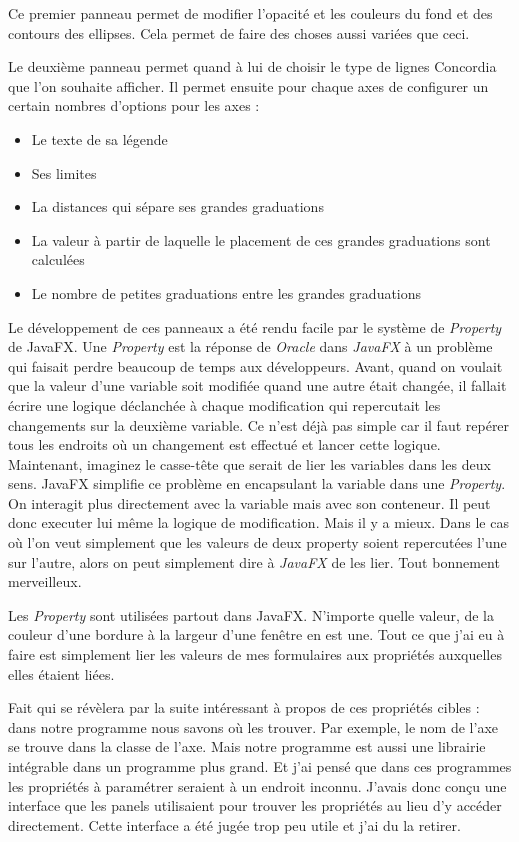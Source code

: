Ce premier panneau permet de modifier l'opacité et les couleurs du fond et des contours des ellipses. Cela permet de faire des choses aussi variées que ceci.


Le deuxième panneau permet quand à lui de choisir le type de lignes Concordia que l'on souhaite afficher. Il permet ensuite pour chaque axes de configurer un certain nombres d'options pour les axes : 
\begin{itemize}
\item Le texte de sa légende
\item Ses limites
\item La distances qui sépare ses grandes graduations
\item La valeur à partir de laquelle le placement de ces grandes graduations sont calculées
\item Le nombre de petites graduations entre les grandes graduations
\end{itemize}

Le développement de ces panneaux a été rendu facile par le système de \textit{Property} de JavaFX. Une \textit{Property} est la réponse de \textit{Oracle} dans \textit{JavaFX} à un problème qui faisait perdre beaucoup de temps aux développeurs. Avant, quand on voulait que la valeur d'une variable soit modifiée quand une autre était changée, il fallait écrire une logique déclanchée à chaque modification qui repercutait les changements sur la deuxième variable. Ce n'est déjà pas simple car il faut repérer tous les endroits où un changement est effectué et lancer cette logique. Maintenant, imaginez le casse-tête que serait de lier les variables dans les deux sens. JavaFX simplifie ce problème en encapsulant la variable dans une \textit{Property}. On interagit plus directement avec la variable mais avec son conteneur. Il peut donc executer lui même la logique de modification. Mais il y a mieux. Dans le cas où l'on veut simplement que les valeurs de deux property soient repercutées l'une sur l'autre, alors on peut simplement dire à \textit{JavaFX} de les lier. Tout bonnement merveilleux.

Les \textit{Property} sont utilisées partout dans JavaFX. N'importe quelle valeur, de la couleur d'une bordure à la largeur d'une fenêtre en est une. Tout ce que j'ai eu à faire est simplement lier les valeurs de mes formulaires aux propriétés auxquelles elles étaient liées. 

Fait qui se révèlera par la suite intéressant à propos de ces propriétés cibles : dans notre programme nous savons où les trouver. Par exemple, le nom de l'axe se trouve dans la classe de l'axe. Mais notre programme est aussi une librairie intégrable dans un programme plus grand. Et j'ai pensé que dans ces programmes les propriétés à paramétrer seraient à un endroit inconnu. J'avais donc conçu une interface que les panels utilisaient pour trouver les propriétés au lieu d'y accéder directement. Cette interface a été jugée trop peu utile et j'ai du la retirer.
